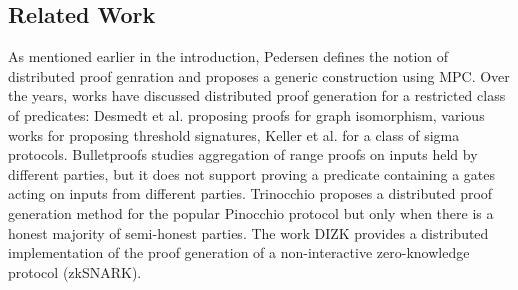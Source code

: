 \subsection{Related Work}\label{sec:relatedwork}
As mentioned earlier in the introduction, Pedersen \cite{Ped92} defines the notion of distributed proof genration and proposes a generic construction using MPC. Over the years, works have discussed distributed proof generation for a restricted class of predicates: Desmedt et al. \cite{DDB94} proposing proofs for graph isomorphism, various works \cite{King05, DDS, Desmedt2011} for proposing threshold signatures, Keller et al. \cite{EfficientTZ} for a class of sigma protocols. Bulletproofs \cite{bulletproofs} studies aggregation of range proofs on inputs held by different parties, but it does not support proving a predicate containing a gates acting on inputs from different parties.
Trinocchio \cite{trinocchio} proposes a distributed proof generation method for the popular Pinocchio protocol \cite{pinnochio_PHGR} but only when there is a honest majority of semi-honest parties. The work DIZK \cite{dizk} provides a distributed implementation of the proof generation of a non-interactive zero-knowledge protocol (zkSNARK).


